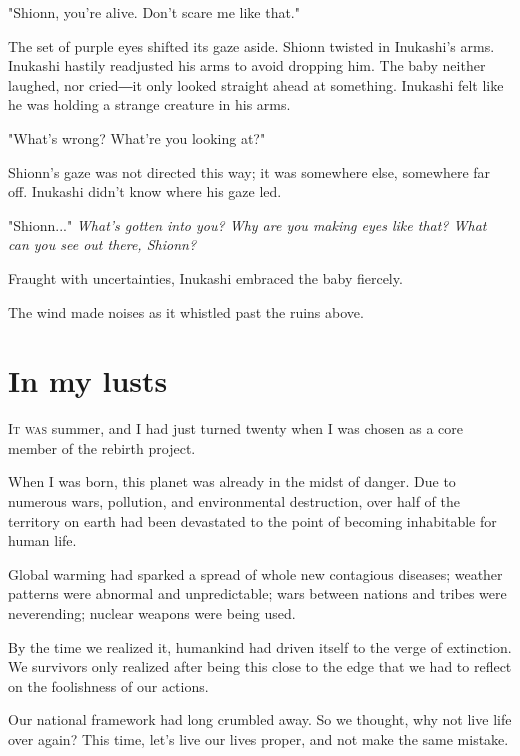"Shionn, you're alive. Don't scare me like that."

The set of purple eyes shifted its gaze aside. Shionn twisted in
Inukashi's arms. Inukashi hastily readjusted his arms to avoid dropping
him. The baby neither laughed, nor cried―it only looked straight ahead
at something. Inukashi felt like he was holding a strange creature in
his arms.

"What's wrong? What're you looking at?"

Shionn's gaze was not directed this way; it was somewhere else,
somewhere far off. Inukashi didn't know where his gaze led.

"Shionn..." \emph{What's gotten into you? Why are you making eyes like that?
	What can you see out there, Shionn?}

Fraught with uncertainties, Inukashi embraced the baby fiercely.

The wind made noises as it whistled past the ruins above.

\chapter{In my lusts}


\lettrine[ante=``]{I}{t was} summer, and I had just turned twenty when I was chosen as a core
member of the rebirth project.

When I was born, this planet was already in the midst of danger. Due to
numerous wars, pollution, and environmental destruction, over half of
the territory on earth had been devastated to the point of becoming
inhabitable for human life.

Global warming had sparked a spread of whole new contagious diseases;
weather patterns were abnormal and unpredictable; wars between nations
and tribes were neverending; nuclear weapons were being used.

By the time we realized it, humankind had driven itself to the verge of
extinction. We survivors only realized after being this close to the
edge that we had to reflect on the foolishness of our actions.

Our national framework had long crumbled away. So we thought, why not
live life over again? This time, let's live our lives proper, and not
make the same mistake.

